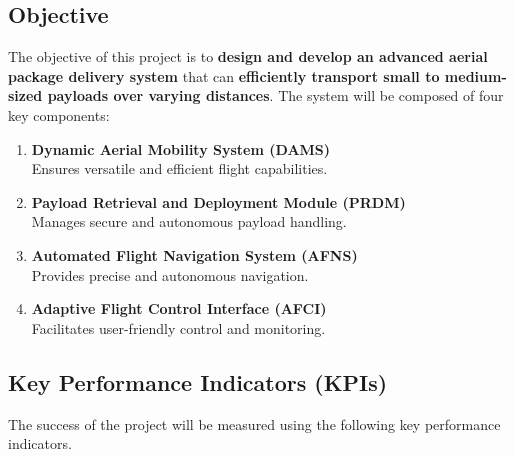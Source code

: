 \documentclass[12pt]{article}
\begin{document}
\subsection{Objective}
The objective of this project is to \textbf{design and develop an advanced aerial package delivery system} that can \textbf{efficiently transport small to medium-sized payloads over varying distances}. The system will be composed of four key components:
\begin{enumerate}
    \item \textbf{Dynamic Aerial Mobility System (DAMS)} \\
    Ensures versatile and efficient flight capabilities.
    \item \textbf{Payload Retrieval and Deployment Module (PRDM)} \\
    Manages secure and autonomous payload handling.
    \item \textbf{Automated Flight Navigation System (AFNS)} \\
    Provides precise and autonomous navigation.
    \item \textbf{Adaptive Flight Control Interface (AFCI)} \\
    Facilitates user-friendly control and monitoring.
\end{enumerate}

\subsection{Key Performance Indicators (KPIs)}
The success of the project will be measured using the following key performance indicators.
\end{document}
